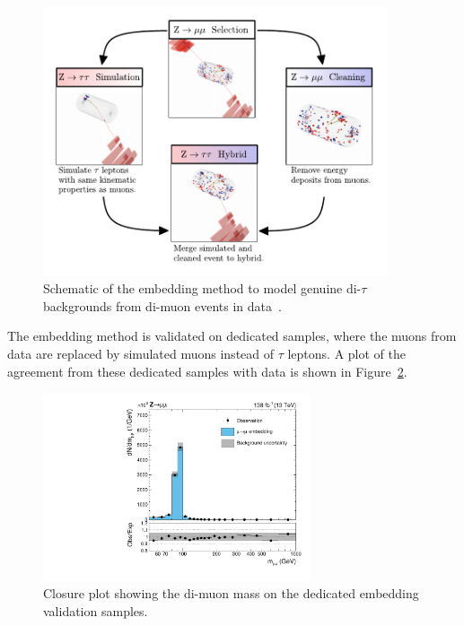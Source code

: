\begin{figure}[!hbtp]
\centering
    \includegraphics[width=0.9\textwidth]{Figures/Embedding_Diagram.pdf}
\caption[Diagram of the embedding method.]{Schematic of the embedding method to model genuine di-$\tau$ backgrounds from di-muon events in data~\cite{CMS_embedding}.}
\label{fig:embedding}
\end{figure}

The embedding method is validated on dedicated samples, where the muons from data are replaced by simulated muons instead of $\tau$ leptons.
A plot of the agreement from these dedicated samples with data is shown in Figure~\ref{fig:emb_validation}.

\begin{figure}[!hbtp]
\centering
    \includegraphics[width=0.7\textwidth]{Figures/embedding_validation.pdf}
\caption[Plot of the validation of the embedding method.]{Closure plot showing the di-muon mass on the dedicated embedding validation samples.}
\label{fig:emb_validation}
\end{figure}

